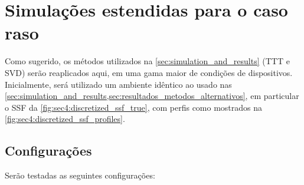 
\setcounter{const}{0}



\section{Simulações estendidas para o caso raso}
\label{sec:mais_simulacoes_raso}

Como sugerido, os métodos utilizados na \cref{sec:simulation_and_results} (TTT e SVD) serão reaplicados aqui, em uma gama maior de condições de dispositivos. Inicialmente, será utilizado um ambiente idêntico ao usado nas \cref{sec:simulation_and_results,sec:resultados_metodos_alternativos}, em particular o SSF da \cref{fig:sec4:discretized_ssf_true}, com perfis como mostrados na \cref{fig:sec4:discretized_ssf_profiles}.

\subsection{Configurações}

Serão testadas as seguintes configurações:


